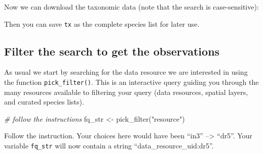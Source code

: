 \documentclass[
  10pt,
]{article}
\newenvironment{Shaded}{\begin{snugshade}}{\end{snugshade}}
\newcommand{\AttributeTok}[1]{\textcolor[rgb]{0.77,0.63,0.00}{#1}}
\newcommand{\CommentTok}[1]{\textcolor[rgb]{0.56,0.35,0.01}{\textit{#1}}}
\newcommand{\ConstantTok}[1]{\textcolor[rgb]{0.00,0.00,0.00}{#1}}
\newcommand{\DocumentationTok}[1]{\textcolor[rgb]{0.56,0.35,0.01}{\textbf{\textit{#1}}}}
\newcommand{\FunctionTok}[1]{\textcolor[rgb]{0.00,0.00,0.00}{#1}}
\newcommand{\NormalTok}[1]{#1}
\newcommand{\OtherTok}[1]{\textcolor[rgb]{0.56,0.35,0.01}{#1}}
\newcommand{\SpecialCharTok}[1]{\textcolor[rgb]{0.00,0.00,0.00}{#1}}
\newcommand{\StringTok}[1]{\textcolor[rgb]{0.31,0.60,0.02}{#1}}
\begin{document}
Now we can download the taxonomic data (note that the search is case-sensitive):

\begin{Shaded}
\end{Shaded}

Then you can save \texttt{tx} as the complete species list for later use.

\hypertarget{filter-the-search-to-get-the-observations}{%
\subsection{Filter the search to get the observations}\label{filter-the-search-to-get-the-observations}}

As usual we start by searching for the data resource we are interested in using
the function \texttt{pick\_filter()}. This is an interactive query guiding you through
the many resources available to filtering your query (data resources, spatial
layers, and curated species lists).

\begin{Shaded}
\begin{Highlighting}[]
\CommentTok{\# follow the instructions }
\NormalTok{fq\_str }\OtherTok{\textless{}{-}} \FunctionTok{pick\_filter}\NormalTok{(}\StringTok{"resource"}\NormalTok{) }
\end{Highlighting}
\end{Shaded}

Follow the instruction. Your choices here would have been ``in3'' --\textgreater{} ``dr5''.
Your variable \texttt{fq\_str} will now contain a string ``data\_resource\_uid:dr5''.
\end{document}
